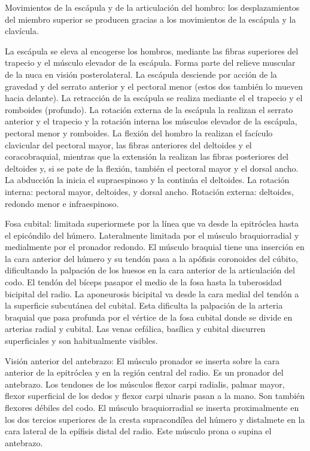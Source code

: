 Movimientos de la escápula y de la articulación del hombro: los desplazamientos del miembro superior se producen gracias a los movimientos de la escápula y la clavícula.

La escápula se eleva al encogerse los hombros, mediante las fibras superiores del trapecio y el músculo elevador de la escápula. Forma parte del relieve muscular de la nuca en visión posterolateral. La escápula desciende por acción de la gravedad y del serrato anterior y el pectoral menor (estos dos también lo mueven hacia delante). La retracción de la escápula se realiza mediante el el trapecio y el romboides (profundo). La rotación externa de la escápula la realizan el serrato anterior y el trapecio y la rotación interna los músculos elevador de la escápula, pectoral menor y romboides. La flexión del hombro la realizan el facículo clavicular del pectoral mayor, las fibras anteriores del deltoides y el coracobraquial, mientras que la extensión la realizan las fibras posteriores del deltoides y, si se pate de la flexión, también el pectoral mayor y el dorsal ancho. La abducción la inicia el supraespinoso y la continúa el deltoides. La rotación interna: pectoral mayor, deltoides, y dorsal ancho. Rotación externa: deltoides, redondo menor e infraespinoso.

Fosa cubital: limitada superiormete por la línea que va desde la epitróclea hasta el epicóndilo del húmero. Lateralmente limitada por el músculo braquiorradial y medialmente por el pronador redondo.
El músculo braquial tiene una inserción en la cara anterior del húmero y su tendón pasa a la apófisis coronoides del cúbito, dificultando la palpación de los huesos en la cara anterior de la articulación del codo. El tendón del bíceps pasapor el medio de la fosa hasta la tuberosidad bicipital del radio. La aponeurosis bicipital va desde la cara medial del tendón a la superficie subcutánea del cubital. Esta dificulta la palpación de la arteria braquial que pasa profunda por el vértice de la fosa cubital donde se divide en arterias radial y cubital. Las venas cefálica, basílica y cubital discurren superficiales y son habitualmente visibles.

Visión anterior del antebrazo: El músculo pronador se inserta sobre la cara anterior de la epitróclea y en la región central del radio. Es un pronador del antebrazo. Los tendones de los músculos flexor carpi radialis, palmar mayor, flexor superficial de los dedos y flexor carpi ulnaris pasan a la mano. Son también flexores débiles del codo.
El músculo braquiorradial se inserta proximalmente  en los dos tercios superiores de la cresta supracondílea del húmero y distalmete en la cara lateral de la epífisis distal del radio. Este músculo prona o supina el antebrazo.

